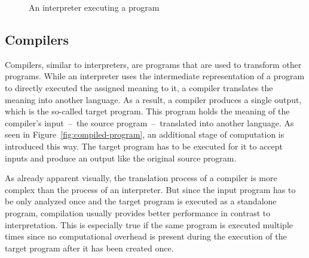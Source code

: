 \begin{figure}[h]
  \centering
  \caption{An interpreter executing a program}\label{fig:interpreted-program}
\end{figure}


\subsection{Compilers}

Compilers, similar to interpreters, are programs that are used to transform other programs.
While an interpreter uses the intermediate representation of a program to directly executed the assigned meaning to it, a compiler translates the meaning into another language.
As a result, a compiler produces a single output, which is the so-called target program.
This program holds the meaning of the compiler's input~--~the source program~--~translated into another language.
As seen in Figure~\ref{fig:compiled-program}, an additional stage of computation is introduced this way.
The target program has to be executed for it to accept inputs and produce an output like the original source program.

As already apparent visually, the translation process of a compiler is more complex than the process of an interpreter.
But since the input program has to be only analyzed once and the target program is executed as a standalone program, compilation usually provides better performance in contrast to interpretation.
This is especially true if the same program is executed multiple times since no computational overhead is present during the execution of the target program after it has been created once.

